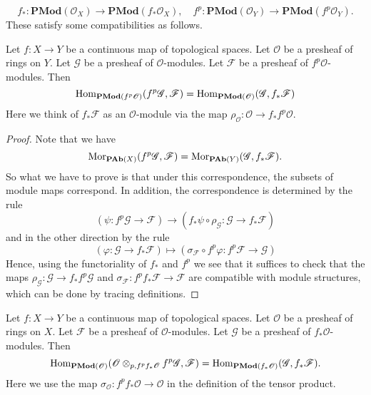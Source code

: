 \[f_*:\mathbf{PMod}(\mathscr{O}_X)\to\mathbf{PMod}(f_*\mathscr{O}_X),\quad f^p:\mathbf{PMod}(\mathscr{O}_Y)\to\mathbf{PMod}(f^p\mathscr{O}_Y).\]
These satisfy some compatibilities as follows.
\begin{proposition}\label{pull back presheaf module adj}
Let $f:X\to Y$ be a continuous map of topological spaces. Let $\mathscr{O}$ be a presheaf of rings on $Y$. Let $\mathscr{G}$ be a presheaf of $\mathscr{O}$-modules. Let $\mathscr{F}$ be a presheaf of $f^p\mathscr{O}$-modules. Then
\[\mathrm{Hom}_{\mathbf{PMod}(f^p\mathscr{O})}(f^p\mathscr{G},\mathscr{F})=\mathrm{Hom}_{\mathbf{PMod}(\mathscr{O})}(\mathscr{G},f_*\mathscr{F})\]
Here we think of $f_*\mathscr{F}$ as an $\mathscr{O}$-module via the map $\rho_{\mathscr{O}}:\mathscr{O}\to f_*f^p\mathscr{O}$.
\end{proposition}
\begin{proof}
Note that we have
\[\mathrm{Mor}_{\mathbf{PAb}(X)}(f^p\mathscr{G},\mathscr{F})=\mathrm{Mor}_{\mathbf{PAb}(Y)}(\mathscr{G},f_*\mathscr{F}).\]
So what we have to prove is that under this correspondence, the subsets of module maps correspond. In addition, the correspondence is determined by the rule
\[(\psi:f^p\mathscr{G}\to\mathscr{F})\to(f_*\psi\circ\rho_{\mathscr{G}}:\mathscr{G}\to f_*\mathscr{F})\]
and in the other direction by the rule
\[(\varphi:\mathscr{G}\to f_*\mathscr{F})\mapsto(\sigma_{\mathscr{F}}\circ f^p\varphi:f^p\mathscr{F}\to\mathscr{G})\]
Hence, using the functoriality of $f_*$ and $f^p$ we see that it suffices to check that the maps $\rho_{\mathscr{G}}:\mathscr{G}\to f_*f^p\mathscr{G}$ and $\sigma_{\mathscr{F}}:f^pf_*\mathscr{F}\to\mathscr{F}$ are compatible with module structures, which can be done by tracing definitions.
\end{proof}
\begin{proposition}\label{pushforward presheaf module adj}
Let $f:X\to Y$ be a continuous map of topological spaces. Let $\mathscr{O}$ be a presheaf of rings on $X$. Let $\mathscr{F}$ be a presheaf of $\mathscr{O}$-modules. Let $\mathscr{G}$ be a presheaf of $f_*\mathscr{O}$-modules. Then
\[\mathrm{Hom}_{\mathbf{PMod}(\mathscr{O})}(\mathscr{O}\otimes_{p,f^pf_*\mathscr{O}}f^p\mathscr{G},\mathscr{F})=\mathrm{Hom}_{\mathbf{PMod}(f_*\mathscr{O})}(\mathscr{G},f_*\mathscr{F}).\]
Here we use the map $\sigma_{\mathscr{O}}:f^pf_*\mathscr{O}\to\mathscr{O}$ in
the definition of the tensor product.
\end{proposition}
